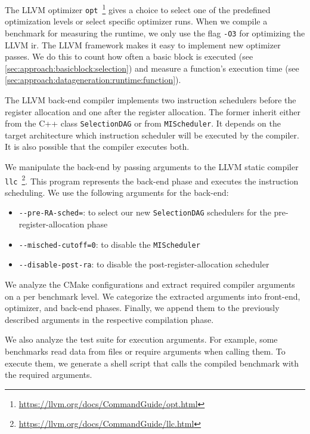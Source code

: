 The LLVM optimizer \lstinline{opt}~\footnote{\url{https://llvm.org/docs/CommandGuide/opt.html}} gives a choice to select one of the predefined optimization levels or select specific optimizer runs.
When we compile a benchmark for measuring the runtime, we only use the flag \lstinline{-O3} for optimizing the LLVM \ac{ir}.
The LLVM framework makes it easy to implement new optimizer passes.
We do this to count how often a basic block is executed (see \cref{sec:approach:basicblock:selection}) and measure a function's execution time (see \cref{sec:approach:datageneration:runtime:function}).

The LLVM back-end compiler implements two instruction schedulers before the register allocation and one after the register allocation.
The former inherit either from the C++ class \lstinline{SelectionDAG} or from \lstinline{MIScheduler}.
It depends on the target architecture which instruction scheduler will be executed by the compiler. 
It is also possible that the compiler executes both.

We manipulate the back-end by passing arguments to the LLVM static compiler \lstinline{llc}~\footnote{\url{https://llvm.org/docs/CommandGuide/llc.html}}.
This program represents the back-end phase and executes the instruction scheduling.
We use the following arguments for the back-end:
\begin{itemize}
    \item \lstinline{--pre-RA-sched=}: to select our new \lstinline{SelectionDAG} schedulers for the pre-register-allocation phase
    \item \lstinline{--misched-cutoff=0}: to disable the \lstinline{MIScheduler}
    \item \lstinline{--disable-post-ra}: to disable the post-register-allocation scheduler
\end{itemize}

We analyze the CMake configurations and extract required compiler arguments on a per benchmark level.
We categorize the extracted arguments into front-end, optimizer, and back-end phases.
Finally, we append them to the previously described arguments in the respective compilation phase.

We also analyze the test suite for execution arguments.
For example, some benchmarks read data from files or require arguments when calling them.
To execute them, we generate a shell script that calls the compiled benchmark with the required arguments.

